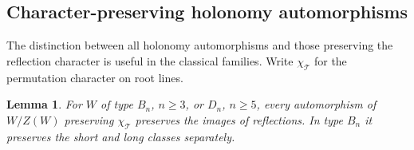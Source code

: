 \documentclass[11pt]{amsart}
\newtheorem{lemma}[theorem]{Lemma}
\theoremstyle{definition}
\newcommand{\T}{\mathcal{T}}
\begin{document}
\subsection{Character-preserving holonomy automorphisms}\label{sec:classical-quotients}

The distinction between all holonomy automorphisms and those preserving the reflection character is
useful in the classical families. Write $\chi_\T$ for the permutation character on root lines.

\begin{lemma}\label{lem:classical-character}
For $W$ of type $B_n$, $n\ge3$, or $D_n$, $n\ge5$, every automorphism of $W/Z(W)$ preserving
$\chi_\T$ preserves the images of reflections. In type $B_n$ it preserves the short and long classes separately.
\end{lemma}
\end{document}
